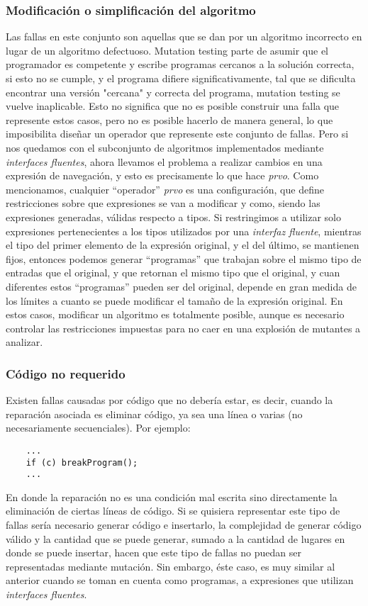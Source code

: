 \subsubsection{Modificaci\'on o simplificaci\'on del algoritmo}

Las fallas en este conjunto son aquellas que se dan por un algoritmo incorrecto en lugar de un algoritmo defectuoso. Mutation testing parte de asumir que el programador es competente y escribe programas cercanos a la soluci\'on correcta, si esto no se cumple, y el programa difiere significativamente, tal que se dificulta encontrar una versi\'on "cercana" y correcta del programa, mutation testing se vuelve inaplicable. Esto no significa que no es posible construir una falla que represente estos casos, pero no es posible hacerlo de manera general, lo que imposibilita dise\~nar un operador que represente este conjunto de fallas. Pero si nos quedamos con el subconjunto de algoritmos implementados mediante \emph{interfaces fluentes}, ahora llevamos el problema a realizar cambios en una expresi\'on de navegaci\'on, y esto es precisamente lo que hace \emph{prvo}. Como mencionamos, cualquier ``operador'' \emph{prvo} es una configuraci\'on, que define restricciones sobre que expresiones se van a modificar y como, siendo las expresiones generadas, v\'alidas respecto a tipos. Si restringimos a utilizar solo expresiones pertenecientes a los tipos utilizados por una \emph{interfaz fluente}, mientras el tipo del primer elemento de la expresi\'on original, y el del \'ultimo, se mantienen fijos, entonces podemos generar ``programas'' que trabajan sobre el mismo tipo de entradas que el original, y que retornan el mismo tipo que el original, y cuan diferentes estos ``programas'' pueden ser del original, depende en gran medida de los l\'imites a cuanto se puede modificar el tama\~no de la expresi\'on original. En estos casos, modificar un algoritmo es totalmente posible, aunque es necesario controlar las restricciones impuestas para no caer en una explosi\'on de mutantes a analizar.

\subsubsection{C\'odigo no requerido} %

Existen fallas causadas por c\'odigo que no deber\'ia estar, es decir, cuando la reparaci\'on asociada es eliminar c\'odigo, ya sea una l\'inea o varias (no necesariamente secuenciales). Por ejemplo:
\begin{lstlisting}
	...
	if (c) breakProgram();
	...
\end{lstlisting}
En donde la reparaci\'on no es una condici\'on mal escrita sino directamente la eliminaci\'on de ciertas l\'ineas de c\'odigo. Si se quisiera representar este tipo de fallas ser\'ia necesario generar c\'odigo e insertarlo, la complejidad de generar c\'odigo v\'alido y la cantidad que se puede generar, sumado a la cantidad de lugares en donde se puede insertar, hacen que este tipo de fallas no puedan ser representadas mediante mutaci\'on. Sin embargo, \'este caso, es muy similar al anterior cuando se toman en cuenta como programas, a expresiones que utilizan \emph{interfaces fluentes}.

